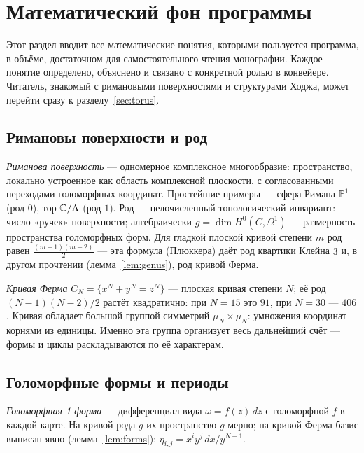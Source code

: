 
\section{Математический фон программы}\label{sec:background}

Этот раздел вводит все математические понятия, которыми пользуется
программа, в объёме, достаточном для самостоятельного чтения
монографии. Каждое понятие определено, объяснено и связано с
конкретной ролью в конвейере. Читатель, знакомый с римановыми
поверхностями и структурами Ходжа, может перейти сразу к
разделу~\ref{sec:torus}.

\subsection{Римановы поверхности и род}

\emph{Риманова поверхность} --- одномерное комплексное
многообразие: пространство, локально устроенное как область
комплексной плоскости, с согласованными переходами голоморфных
координат. Простейшие примеры --- сфера Римана $\mathbb{P}^1$ (род
$0$), тор $\mathbb{C}/\Lambda$ (род $1$). Род --- целочисленный
топологический инвариант: число «ручек» поверхности; алгебраически
$g=\dim H^0(C,\Omega^1)$ --- размерность пространства голоморфных
форм. Для гладкой плоской кривой степени $m$ род равен
$\tfrac{(m-1)(m-2)}{2}$ --- эта формула (Плюккера) даёт род
квартики Клейна $3$ и, в другом прочтении (лемма~\ref{lem:genus}),
род кривой Ферма.

\emph{Кривая Ферма} $C_N=\{x^N+y^N=z^N\}$ --- плоская кривая
степени $N$; её род $(N-1)(N-2)/2$ растёт квадратично: при $N=15$
это $91$, при $N=30$ --- $406$. Кривая обладает большой группой
симметрий $\mu_N\times\mu_N$: умножения координат корнями из
единицы. Именно эта группа организует весь дальнейший счёт ---
формы и циклы раскладываются по её характерам.

\subsection{Голоморфные формы и периоды}

\emph{Голоморфная 1-форма} --- дифференциал вида $\omega=f(z)\,dz$
с голоморфной $f$ в каждой карте. На кривой рода $g$ их пространство
$g$-мерно; на кривой Ферма базис выписан явно (лемма~\ref{lem:forms}):
$\eta_{i,j}=x^iy^j\,dx/y^{N-1}$.

